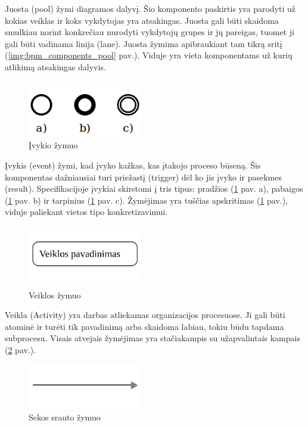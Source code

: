 Juosta (pool) žymi diagramos dalyvį. Šio komponento paskirtis yra parodyti už kokias veiklas ir koks vykdytojas yra atsakingas. Juosta gali būti skaidoma smulkiau norint konkrečiau nurodyti vykdytojų grupes ir jų pareigas, tuomet ji gali būti vadinama linija (lane). Juosta žymima apibraukiant tam tikrą sritį (\ref{img:bpm_components_pool} pav.). Viduje yra vieta komponentams už kurių atlikimą atsakingas dalyvis.

\begin{figure}[H]
	\centering
	\includegraphics[width=5cm]{img/bpm-components/event_types}
	\caption{Įvykio žymuo}
	\label{img:bpm_event_types}
\end{figure}

Įvykis (event) žymi, kad įvyko kažkas, kas įtakojo proceso būseną. Šis komponentas dažniausiai turi priežastį (trigger) dėl ko jis įvyko ir pasekmes (result). Specifikacijoje įvykiai skirstomi į tris tipus: pradžios (\ref{img:bpm_event_types} pav. a), pabaigos (\ref{img:bpm_event_types} pav. b) ir tarpinius (\ref{img:bpm_event_types} pav. c). Žymėjimas yra tuščias apskritimas (\ref{img:bpm_event_types} pav.), viduje paliekant vietos tipo konkretizavimui.

\begin{figure}[H]
	\centering
	\includegraphics[width=5cm]{img/bpm-components/activity}
	\caption{Veiklos žymuo}
	\label{img:bpm_components_activity}
\end{figure}

Veikla (Activity) yra darbas atliekamas organizacijos procesuose. Ji gali būti atominė ir turėti tik pavadinimą arba  skaidoma labiau, tokiu būdu tapdama subprocesu. Visais atvejais žymėjimas yra stačiakampis su užapvalintais kampais (\ref{img:bpm_components_activity} pav.).

\begin{figure}[H]
	\centering
	\includegraphics[width=5cm]{img/bpm-components/transition}
	\caption{Sekos srauto žymuo}
	\label{img:bpm_components_sequence_flow}
\end{figure}

